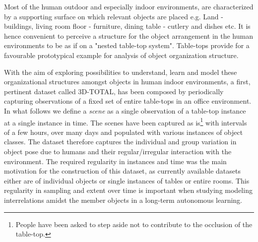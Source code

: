 \documentclass[letterpaper, 10 pt, conference]{ieeeconf}  %
\begin{document}
Most of the human outdoor and especially indoor environments, are characterized by a supporting surface on which relevant objects are placed 
e.g. Land - buildings, living room floor - furniture, dining table - cutlery and dishes etc. It is hence convenient to perceive a structure 
for the object arrangement in the human environments to be as if on a "nested table-top system". Table-tops provide for a favourable 
prototypical example for analysis of object organization structure. 

With the aim of exploring possibilities to understand, learn and model these organizational structures amongst objects in human indoor 
environments, a first, pertinent dataset called 3D-TOTAL, has been composed by periodically capturing observations of a fixed set of entire 
table-tops in an office environment. In what follows we define a \textit{scene} as a single observation of a table-top instance at a single 
instance in time. The scenes have been captured as is\footnote{People have been asked to step aside not to contribute to the occlusion of 
the table-top.} with intervals of a few hours, over many days and populated with various instances of object classes. The dataset therefore 
captures the individual and group variation in object pose due to humans and their regular/irregular interaction with the environment. The required regularity in instances and time was the main motivation for the construction of this dataset, as currently available datasets either are of individual objects or single instances of tables or entire rooms. This regularity in sampling and extent over time is important when studying modeling interrelations amidst the member objects in a long-term autonomous learning. 
\end{document}
